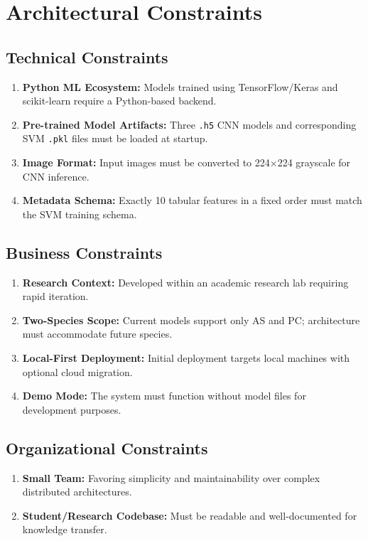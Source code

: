 \documentclass[11pt,a4paper,oneside]{report}
\newcommand{\file}[1]{\texttt{\footnotesize #1}}
\begin{document}
\newpage
\section{Architectural Constraints}

\subsection{Technical Constraints}
\begin{enumerate}
  \item \textbf{Python ML Ecosystem:} Models trained using TensorFlow/Keras and scikit-learn require a Python-based backend.
  \item \textbf{Pre-trained Model Artifacts:} Three \file{.h5} CNN models and corresponding SVM \file{.pkl} files must be loaded at startup.
  \item \textbf{Image Format:} Input images must be converted to 224$\times$224 grayscale for CNN inference.
  \item \textbf{Metadata Schema:} Exactly 10 tabular features in a fixed order must match the SVM training schema.
\end{enumerate}

\subsection{Business Constraints}
\begin{enumerate}
  \item \textbf{Research Context:} Developed within an academic research lab requiring rapid iteration.
  \item \textbf{Two-Species Scope:} Current models support only AS and PC; architecture must accommodate future species.
  \item \textbf{Local-First Deployment:} Initial deployment targets local machines with optional cloud migration.
  \item \textbf{Demo Mode:} The system must function without model files for development purposes.
\end{enumerate}

\subsection{Organizational Constraints}
\begin{enumerate}
  \item \textbf{Small Team:} Favoring simplicity and maintainability over complex distributed architectures.
  \item \textbf{Student/Research Codebase:} Must be readable and well-documented for knowledge transfer.
\end{enumerate}
\end{document}
